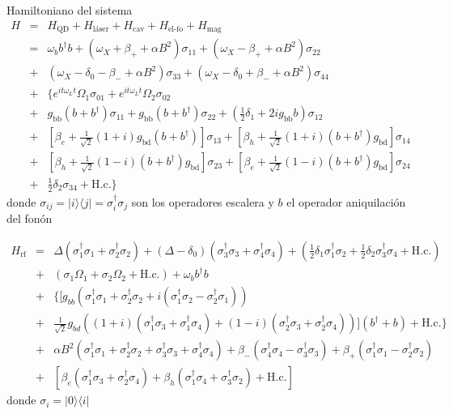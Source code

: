 \documentclass[../main.tex]{subfiles}
\begin{document}
Hamiltoniano del sistema
\begin{eqnarray}
	H&=& H_\text{QD} + H_\text{láser} + H_\text{cav} + H_\text{el-fo} + H_\text{mag} \nonumber\\
	&=& \omega_b b^\dagger b + (\omega_X + \beta_+ + \alpha B^2)\sigma_{11} + (\omega_X - \beta_+ +\alpha B^2)\sigma_{22} \nonumber\\
	&+& (\omega_X - \delta_0 - \beta_- + \alpha B^2)\sigma_{33} + (\omega_X - \delta_0 + \beta_- + \alpha B^2)\sigma_{44} \nonumber\\
	&+& \{e^{it\omega_L t}\Omega_1\sigma_{01} + e^{it\omega_L t}\Omega_2\sigma_{02} \nonumber\\
	&+& g_{\text{bb}} (b+b^\dagger) \sigma_{11} + g_{\text{bb}} (b+b^\dagger) \sigma_{22} + (\tfrac{1}{2}\delta_1 + 2ig_{\text{bb}}b)\sigma_{12}\nonumber\\
	&+& [\beta_e + \tfrac{1}{\sqrt{2}} (1+i) g_{\text{bd}} (b+b^\dagger)]\sigma _{13} + [\beta_h + \tfrac{1}{\sqrt{2}}(1+i) (b+b^\dagger) g_{\text{bd}}]\sigma _{14} \nonumber\\
	&+& [\beta _h + \tfrac{1}{\sqrt{2}} (1-i)(b+b^\dagger) g_{\text{bd}}]\sigma_{23} + [\beta_e + \tfrac{1}{\sqrt{2}}(1-i) (b+b^\dagger) g_{\text{bd}}]\sigma_{24}\nonumber\\
	&+& \tfrac{1}{2}\delta _2 \sigma_{34} + \text{H.c.}\}
\end{eqnarray}
donde $\sigma_{ij} = |i\rangle\langle j| = \sigma_i^\dagger\sigma_j$ son los operadores escalera y $b$ el operador aniquilación del fonón

\begin{eqnarray}
	H_\text{rf}&=&\Delta (\sigma_1^{\dagger }\sigma_1 + \sigma_2^\dagger\sigma_2) + (\Delta - \delta_0) (\sigma_3^\dagger\sigma_3 + \sigma_4^\dagger\sigma_4) + (\tfrac{1}{2}\delta_1 \sigma_1^\dagger\sigma_2 + \tfrac{1}{2}\delta_2\sigma_3^\dagger\sigma_4 + \text{H.c.}) \nonumber\\
	&+&(\sigma_1 \Omega_1 + \sigma_2 \Omega_2 + \text{H.c.}) + \omega_b b^\dagger b \nonumber\\
	&+&\{[g_{bb} (\sigma_1^\dagger\sigma_1 + \sigma_2^\dagger\sigma_2 + i (\sigma_1^\dagger\sigma_2 - \sigma_2^\dagger\sigma_1)) \nonumber\\
	&+& \tfrac{1}{\sqrt{2}} g_{bd} ((1+i) (\sigma_1^\dagger\sigma_3 + \sigma_1^\dagger\sigma_4) + (1-i) (\sigma_2^\dagger\sigma_3 + \sigma_2^\dagger\sigma_4))](b^\dagger + b) + \text{H.c.}\} \nonumber\\
	&+& \alpha  B^2(\sigma_1^\dagger\sigma_1 + \sigma_2^\dagger\sigma_2 + \sigma_3^\dagger\sigma_3 + \sigma_4^\dagger\sigma_4) + \beta_- (\sigma_4^\dagger\sigma_4 - \sigma_3^\dagger\sigma_3) + \beta_+(\sigma_1^\dagger\sigma_1 - \sigma_2^\dagger\sigma_2) \nonumber\\
	&+& [\beta_e (\sigma_1^\dagger\sigma_3 + \sigma_2^\dagger\sigma_4) + \beta_h (\sigma _1^\dagger\sigma_4 + \sigma_3^\dagger\sigma_2) + \text{H.c.}]
\end{eqnarray}
donde $\sigma_i = |0\rangle\langle i|$
\end{document}

